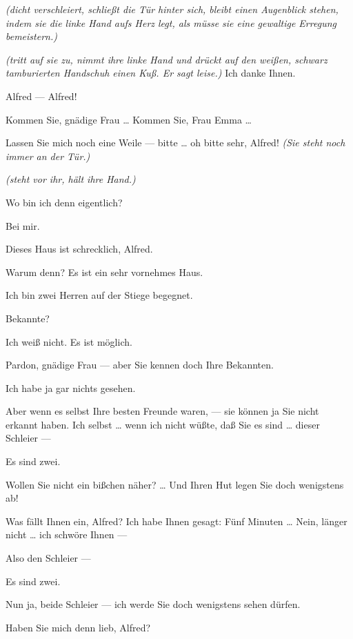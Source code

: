 \documentclass[
	final,
	a4paper,
	ngerman,
	mpinclude = true, %
	twoside = true,
	open = right,
	cleardoublepage = plain,
	DIV = 13,
	BCOR = 1cm,
	titlepage = firstiscover,
	]{scrbook}
\newcommand{\direction}[1]{\textit{(#1)}}
\newcommand{\thecharacter}[1]{\textup{\textsc{#1}}}
\newcommand{\theherr}{\thecharacter{Junger Herr}}
\newcommand{\thefrau}{\thecharacter{Junge Frau}}
\newcommand{\character}[1]{\item[#1:]}
\newcommand{\herr}{\character{\theherr}}
\newcommand{\frau}{\character{\thefrau}}
\begin{document}
\begin{play}

	\frau
	\direction{dicht verschleiert, schließt die Tür hinter sich, bleibt einen Augenblick stehen, indem sie die linke Hand aufs Herz legt, als müsse sie eine gewaltige Erregung bemeistern.}

	\herr
	\direction{tritt auf sie zu, nimmt ihre linke Hand und drückt auf den weißen, schwarz tamburierten Handschuh einen Kuß. Er sagt leise.} Ich danke Ihnen.

	\frau
	Alfred --- Alfred!

	\herr
	Kommen Sie, gnädige Frau \ldots{} Kommen Sie, Frau Emma \ldots{}

	\frau
	Lassen Sie mich noch eine Weile --- bitte \ldots{} oh bitte sehr, Alfred! \direction{Sie steht noch immer an der Tür.}

	\herr
	\direction{steht vor ihr, hält ihre Hand.}

	\frau
	Wo bin ich denn eigentlich?

	\herr
	Bei mir.

	\frau
	Dieses Haus ist schrecklich, Alfred.

	\herr
	Warum denn? Es ist ein sehr vornehmes Haus.

	\frau
	Ich bin zwei Herren auf der Stiege begegnet.

	\herr
	Bekannte?

	\frau
	Ich weiß nicht. Es ist möglich.

	\herr
	Pardon, gnädige Frau --- aber Sie kennen doch Ihre Bekannten.

	\frau
	Ich habe ja gar nichts gesehen.

	\herr
	Aber wenn es selbst Ihre besten Freunde waren, --- sie können ja Sie nicht erkannt haben. Ich selbst \ldots{} wenn ich nicht wüßte, daß Sie es sind \ldots{} dieser Schleier ---

	\frau
	Es sind zwei.

	\herr
	Wollen Sie nicht ein bißchen näher? \ldots{} Und Ihren Hut legen Sie doch wenigstens ab!

	\frau
	Was fällt Ihnen ein, Alfred? Ich habe Ihnen gesagt: Fünf Minuten \ldots{} Nein, länger nicht \ldots{} ich schwöre Ihnen ---

	\herr
	Also den Schleier ---

	\frau
	Es sind zwei.

	\herr
	Nun ja, beide Schleier --- ich werde Sie doch wenigstens sehen dürfen.

	\frau
	Haben Sie mich denn lieb, Alfred?


\end{play}
\end{document}
